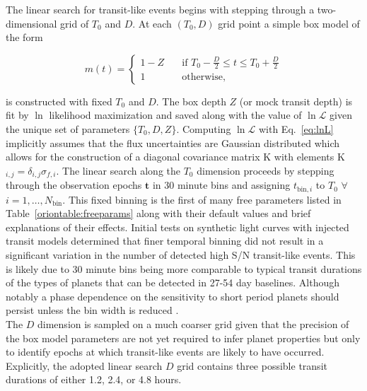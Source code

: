 The linear search for transit-like events begins with stepping through
a two-dimensional grid of $T_0$ and $D$. At each $(T_0,D)$ grid point a simple box model of the form

\begin{equation}
  m(t) =
  \begin{cases}
    1-Z & \quad \text{if } T_0-\frac{D}{2} \leq t \leq T_0+\frac{D}{2} \\
    1 & \quad \text{otherwise,}
  \end{cases}
  \label{eq:boxx}
\end{equation}

\noindent is constructed with fixed $T_0$ and $D$. The box depth $Z$ (or mock transit depth)
is fit by $\ln$ likelihood maximization and saved along with the value of $\ln{\mathcal{L}}$
given the unique set of parameters $\{T_0,D,Z\}$. Computing $\ln{\mathcal{L}}$ with Eq.~\ref{eq:lnL}
implicitly assumes that the flux uncertainties are Gaussian distributed which allows for the
construction of a diagonal covariance matrix K with elements K$_{i,j} = \delta_{i,j} \sigma_{f,i}$.
The linear search along the $T_0$ dimension proceeds by stepping through the observation epochs
$\mathbf{t}$ in 30 minute bins and assigning
$t_{\text{bin},i}$ to $T_0$ $\forall$ $i=1,\dots,N_{\text{bin}}$.
This fixed binning is the first of many \pipeline{} free parameters listed in
Table~\ref{oriontable:freeparams} along with their default values and brief explanations of their
effects. Initial \pipeline{} tests on synthetic light curves with injected transit models
determined that finer temporal binning did not result in a significant variation in the number
of detected high S/N transit-like events. This is likely due to 30 minute bins being more comparable
to typical transit durations of the types of planets that can be detected in 27-54 day baselines.
Although notably a phase dependence on the sensitivity to short period planets should persist
unless the bin width is reduced \citep{kovacs02}. \\

The $D$ dimension is sampled on a much coarser grid
given that the precision of the box model parameters are not yet required to infer planet properties
but only to identify epochs at which transit-like events are likely to have occurred. Explicitly, the
adopted linear search $D$ grid contains three possible transit durations of either 1.2, 2.4, or 4.8 hours. \\



